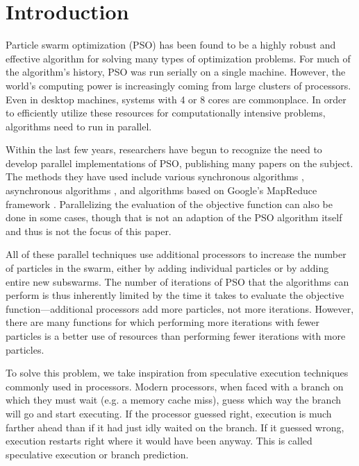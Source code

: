 \documentclass[oneside,honors]{honors}
\begin{document}
\frontmatter
\makepreliminarypages

\doublespace
\tableofcontents
\clearemptydoublepage

\singlespace
\listoffigures
\clearemptydoublepage

\doublespace

\mainmatter


\section{Introduction}
\label{sec:intro}

Particle swarm optimization (PSO) has been found to be a highly robust and
effective algorithm for solving many types of optimization problems.  For much
of the algorithm's history, PSO was run serially on a single machine.  However,
the world's computing power is increasingly coming from large clusters of
processors.  Even in desktop machines, systems with 4 or 8 cores are
commonplace.  In order to efficiently utilize these resources for
computationally intensive problems, algorithms need to run in parallel.

Within the last few years, researchers have begun to recognize the need to
develop parallel implementations of PSO, publishing many papers on the subject.
The methods they have used include various synchronous algorithms
\cite{belal-ijicis04,chu-sci06,jin-aps05,parsopoulos-aia04,schutte-ijnme04},
asynchronous algorithms \cite{koh-ijnme06,mostaghim-report06,venter-wcsmo05},
and algorithms based on Google's MapReduce framework \cite{mcnabb-cec07}.
Parallelizing the evaluation of the objective function can also be done in some
cases, though that is not an adaption of the PSO algorithm itself and thus is
not the focus of this paper.

All of these parallel techniques use additional processors to increase the
number of particles in the swarm, either by adding individual particles or by
adding entire new subswarms.  The number of iterations of PSO that the
algorithms can perform is thus inherently limited by the time it takes to
evaluate the objective function---additional processors add more particles, not
more iterations.  However, there are many functions for which performing more
iterations with fewer particles is a better use of resources than performing
fewer iterations with more particles.  

To solve this problem, we take inspiration from speculative execution
techniques commonly used in processors.  Modern processors, when faced with a
branch on which they must wait (e.g. a memory cache miss), guess which way the
branch will go and start executing.  If the processor guessed right, execution
is much farther ahead than if it had just idly waited on the branch.  If it
guessed wrong, execution restarts right where it would have been anyway.  This
is called speculative execution or branch prediction.
\end{document}
